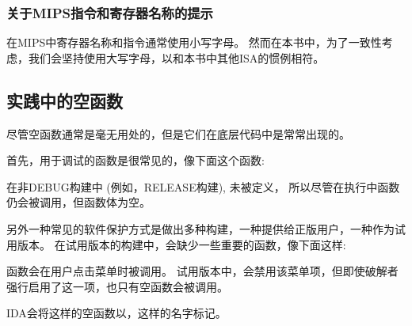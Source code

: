\subsubsection{关于MIPS指令和寄存器名称的提示}

在MIPS中寄存器名称和指令通常使用小写字母。
然而在本书中，为了一致性考虑，我们会坚持使用大写字母，以和本书中其他\ac{ISA}的惯例相符。

\subsection{实践中的空函数}

尽管空函数通常是毫无用处的，但是它们在底层代码中是常常出现的。

首先，用于调试的函数是很常见的，像下面这个函数:



在非DEBUG构建中 (例如，RELEASE构建), 未被定义，
所以尽管在执行中函数仍会被调用，但函数体为空。

另外一种常见的软件保护方式是做出多种构建，一种提供给正版用户，一种作为试用版本。
在试用版本的构建中，会缺少一些重要的函数，像下面这样:



 函数会在用户点击菜单时被调用。
试用版本中，会禁用该菜单项，但即使破解者强行启用了这一项，也只有空函数会被调用。

IDA会将这样的空函数以，这样的名字标记。

